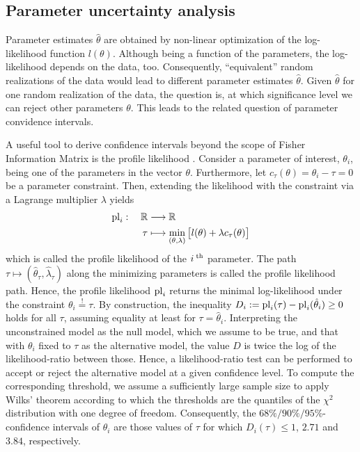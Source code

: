 \documentclass[article]{jss}
\begin{document}

\subsection{Parameter uncertainty analysis}

Parameter estimates $\hat \theta$  are obtained by non-linear optimization of the log-likelihood function $l(\theta)$. Although being a function of the parameters,  the log-likelihood depends on the data, too. Consequently, ``equivalent'' random realizations of the data would lead to different parameter estimates $\hat\theta$. Given $\hat\theta$ for one random realization of the data, the question is, at which significance level we can reject other parameters $\theta$. This leads to the related question of parameter convidence intervals.

A useful tool to derive confidence intervals beyond the scope of Fisher Information Matrix is the profile likelihood \citep{venzon1988method, murphy2000profile}. Consider a parameter of interest, $\theta_i$, being one of the parameters in the vector $\theta$. Furthermore, let $c_{\tau}(\theta) = \theta_i - \tau = 0$ be a parameter constraint.
Then, extending the likelihood with the constraint via a Lagrange multiplier $\lambda$ yields
\begin{align}
	\begin{aligned}
		{\rm pl}_i:\quad \mathbb R & \longrightarrow \mathbb R\\
		\tau & \longmapsto \min_{(\theta, \lambda)} \big[ l(\theta) + \lambda c_{\tau}(\theta) \big]
	\end{aligned}
	\label{eq:pl}
\end{align}
which is called the profile likelihood of the $i^{\;\rm th}$ parameter. The path $\tau \mapsto (\hat\theta_{\tau}, \hat\lambda_{\tau})$ along the minimizing parameters is called the profile likelihood path. Hence, the profile likelihood ${\rm pl}_i$ returns the minimal log-likelihood under the constraint $\theta_i \stackrel{!}{=} \tau$. By construction, the inequality $D_i := {\rm pl}_i(\tau) - {\rm pl}_i(\hat \theta_i) \geq 0$ holds for all $\tau$, assuming equality at least for $\tau = \hat\theta_i$. Interpreting the unconstrained model as the null model, which we assume to be true, and that with $\theta_i$ fixed to $\tau$ as the alternative model, the value $D$ is twice the log of the likelihood-ratio between those. Hence, a likelihood-ratio test can be performed to accept or reject the alternative model at a given confidence level. To compute the corresponding threshold, we assume a sufficiently large sample size to apply Wilks' theorem according to which the thresholds are the quantiles of the $\chi^2$ distribution with one degree of freedom. Consequently, the $68\%/90\%/95\%$-confidence intervals of $\theta_i$ are those values of $\tau$ for which $D_i(\tau) \leq 1$, $2.71$ and $3.84$, respectively.
\end{document}

